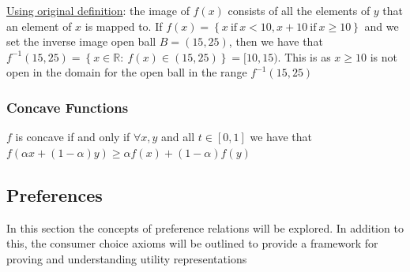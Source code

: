 \documentclass{article}
\begin{document}
  \par
  \underline{Using original definition}: the image of $f(x)$ consists of all the elements of $y$ that an element of $x$ is mapped to. If $f(x) = \left\{x \ \text{if} \ x < 10, x + 10 \ \text{if} \ x \geq 10 \right\}$ and we set the inverse image open ball $B = (15, 25)$, then  we have that $f^{-1}(15,25) = \left\{ x \in \mathbb{R}: \ f(x) \in (15, 25) \right\} = [10, 15)$. This is as $x \geq 10$ is not open in the domain for the open ball in the range $f^{-1}(15,25)$
  \par
\vspace{6mm}
\subsubsection{Concave Functions}
$f$ is concave if and only if $\forall x,y$ and all $t \in [0,1]$ we have that $f(\alpha x + (1-\alpha)y) \geq \alpha f(x) + (1-\alpha)f(y) $\par \vspace{0.3em}

\newpage

\vspace{2.5mm}
\subsection{Preferences}
In this section the concepts of preference relations will be explored. In addition to this, the consumer choice axioms will be outlined to provide a framework for proving and understanding utility representations \par
\vspace{6mm}
\end{document}
